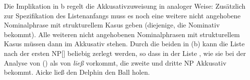 {Die Implikation in b regelt die Akkusativzuweisung in analoger Weise: Zusätzlich
zur Spezifikation des Listenanfangs muss es noch eine weitere nicht angehobene
Nominalphrase mit strukturellem Kasus geben (diejenige, die Nominativ bekommt). Alle weiteren
nicht angehobenen Nominalphrasen mit strukturellem Kasus  müssen dann im Akkusativ stehen.
Durch die beiden \etag in (b) kann die Liste nach der ersten NP[\str] beliebig zerlegt werden,
so dass \zb in der Liste , wie sie bei der Analyse von () als \argstl
von \emph{ließ} vorkommt, die zweite und dritte NP Akkusativ bekommt.
\ea
Aicke ließ den Delphin den Ball holen.
\z






}
